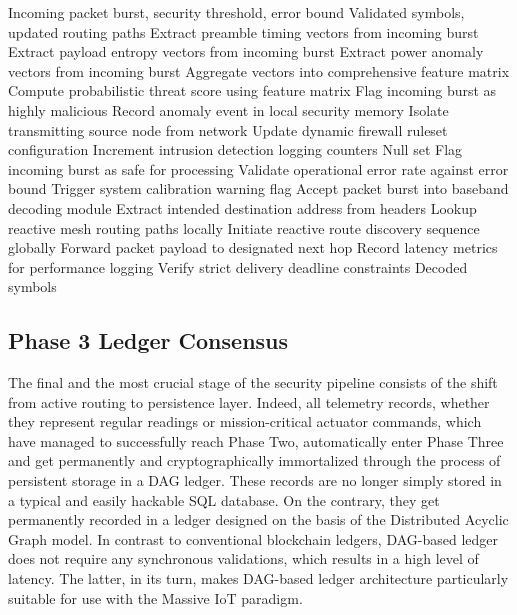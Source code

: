 \documentclass[a4paper,fleqn]{cas-dc}
\numberwithin{equation}{section}
\begin{document}
\begin{algorithm}[!ht]
\caption{Threat Aware Admission and Routing Validation}
\label{alg:mac}
\begin{algorithmic}[1]
\renewcommand{\algorithmicrequire}{\textbf{Input:}}
\renewcommand{\algorithmicensure}{\textbf{Output:}}
\REQUIRE Incoming packet burst, security threshold, error bound
\ENSURE Validated symbols, updated routing paths
\STATE Extract preamble timing vectors from incoming burst
\STATE Extract payload entropy vectors from incoming burst
\STATE Extract power anomaly vectors from incoming burst
\STATE Aggregate vectors into comprehensive feature matrix
\STATE Compute probabilistic threat score using feature matrix
\STATE Flag incoming burst as highly malicious
\STATE Record anomaly event in local security memory
\STATE Isolate transmitting source node from network
\STATE Update dynamic firewall ruleset configuration
\STATE Increment intrusion detection logging counters
\RETURN Null set
\ENDIF
\STATE Flag incoming burst as safe for processing
\STATE Validate operational error rate against error bound
\STATE Trigger system calibration warning flag
\ENDIF
\STATE Accept packet burst into baseband decoding module
\STATE Extract intended destination address from headers
\STATE Lookup reactive mesh routing paths locally
\STATE Initiate reactive route discovery sequence globally
\ENDIF
\STATE Forward packet payload to designated next hop
\STATE Record latency metrics for performance logging
\STATE Verify strict delivery deadline constraints
\RETURN Decoded symbols
\end{algorithmic}
\end{algorithm}


\subsection{Phase 3 Ledger Consensus}

The final and the most crucial stage of the security pipeline consists of the shift from active routing to persistence layer. Indeed, all telemetry records, whether they represent regular readings or mission-critical actuator commands, which have managed to successfully reach Phase Two, automatically enter Phase Three and get permanently and cryptographically immortalized through the process of persistent storage in a DAG ledger. These records are no longer simply stored in a typical and easily hackable SQL database. On the contrary, they get permanently recorded in a ledger designed on the basis of the Distributed Acyclic Graph model. In contrast to conventional blockchain ledgers, DAG-based ledger does not require any synchronous validations, which results in a high level of latency. The latter, in its turn, makes DAG-based ledger architecture particularly suitable for use with the Massive IoT paradigm.
\end{document}
